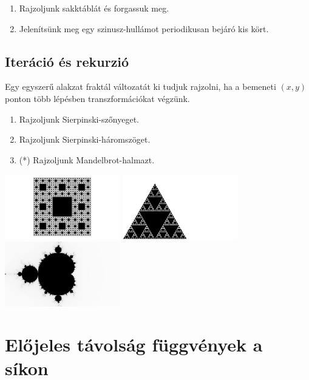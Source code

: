 \progfeladatok

\begin{enumerate}
  \item Rajzoljunk sakktáblát és forgassuk meg.
  \item Jelenítsünk meg egy szinusz-hullámot periodikusan bejáró kis kört.
\end{enumerate}

\subsection{Iteráció és rekurzió}

Egy egyszerű alakzat fraktál változatát ki tudjuk rajzolni, ha a bemeneti $(x,y)$
ponton több lépésben transzformációkat végzünk.

\progfeladatok
\begin{enumerate}
  \item Rajzoljunk Sierpinski-szőnyeget.
  \item Rajzoljunk Sierpinski-háromszöget.
  \item (*) Rajzoljunk Mandelbrot-halmazt.
\end{enumerate}

\includegraphics[width=5cm]{images/sier4.png}
\includegraphics[width=5cm]{images/sier3.png}
\includegraphics[width=5cm]{images/mandel.png}


\section{Előjeles távolság függvények a síkon}

